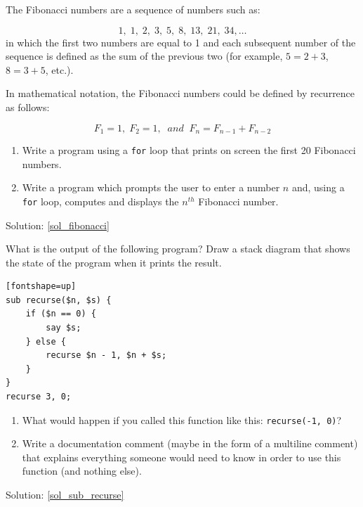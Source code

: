 \begin{exercise} 
\label{fibonacci}
The Fibonacci numbers are a sequence of numbers such as:

\[1, \;1, \;2, \;3, \;5, \;8, \;13, \;21, \;34, \ldots\]
%
in which the first two numbers are equal to 1 and each 
subsequent number of the sequence is defined as the sum of 
the previous two (for example, $5 = 2 + 3$, $8 = 3 + 5$, etc.).

In mathematical notation, the Fibonacci numbers could be defined by recurrence as follows:

\[F_1 = 1, \;F_2 = 1, \;\;and\;\;  F_n = F_{n-1} + F_{n-2} \]
%
\begin{enumerate}

\item Write a program using a {\tt for} loop that prints on screen the first 20 Fibonacci numbers.

\item Write a program which prompts the user to enter a number 
$n$ and, using a {\tt for} loop, computes and displays the 
$n^{th}$ Fibonacci number.

\end{enumerate}

Solution: \ref{sol_fibonacci}


\end{exercise}

\begin{exercise}
\label{sub_recurse}

What is the output of the following program?
Draw a stack diagram that shows the state of the program
when it prints the result.

\begin{verbatim}[fontshape=up]
sub recurse($n, $s) {
    if ($n == 0) {
        say $s;
    } else {
        recurse $n - 1, $n + $s;
    }
}
recurse 3, 0;
\end{verbatim}

\begin{enumerate}

\item What would happen if you called this function like 
this: {\tt recurse(-1, 0)}?

\item Write a documentation comment (maybe in the form of a multiline comment) that explains everything someone would need to know in order to use this function (and nothing else).

\end{enumerate}

Solution: \ref{sol_sub_recurse}

\end{exercise}


